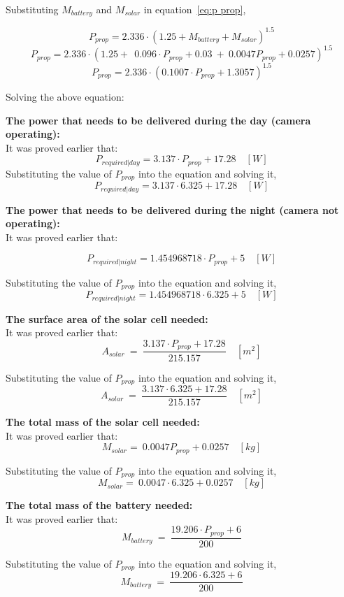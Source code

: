 \p Substituting $ M_{battery} $ and $ M_{solar} $ in equation~\ref{eq:p prop},

\[
P_{prop} = 2.336 \cdot (1.25 + M_{battery} + M_{solar})^{1.5}
\]
\[
P_{prop} = 2.336 \cdot (1.25 + \ \ 0.096 \cdot P_{prop} + 0.03 \ + \ 0.0047 P_{prop} + 0.0257 )^{1.5}
\]
\[
P_{prop} = 2.336 \cdot ( 0.1007 \cdot P_{prop} + 1.3057 )^{1.5}
\]

Solving the above equation:
\boxone

\vspace{1cm}

\p \textbf{The power that needs to be delivered during the day (camera operating):} \vspace{0.1cm}\\
It was proved earlier that:
\[
P_{required|day} = 3.137 \cdot P_{prop} + 17.28 \quad [W]
\]
Substituting the value of $ P_{prop} $ into the equation and solving it,
\[
P_{required|day} = 3.137 \cdot 6.325 + 17.28 \quad [W]
\]
\boxtwo

\vspace{1cm}

\p \textbf{The power that needs to be delivered during the night (camera not operating):} \vspace{0.1cm}\\
It was proved earlier that:

\[
P_{required | night} = 1.454968718 \cdot P_{prop} + 5 \quad [W]
\]

Substituting the value of $ P_{prop} $ into the equation and solving it,
\[
P_{required | night} = 1.454968718 \cdot 6.325 + 5 \quad [W]
\]
\boxthree

\vspace{1cm}

\p \textbf{The surface area of the solar cell needed:} \vspace{0.1cm}\\
It was proved earlier that:
\[
A_{solar} \ = \ \frac{ 3.137 \cdot P_{prop} + 17.28 }{ 215.157 } \quad [m^2]
\]

Substituting the value of $ P_{prop} $ into the equation and solving it,
\[
A_{solar} \ = \ \frac{ 3.137 \cdot 6.325 + 17.28 }{ 215.157 } \quad [m^2]
\]
\boxfour

\vspace{1cm}

\p \textbf{The total mass of the solar cell needed:} \vspace{0.1cm}\\
It was proved earlier that:
\[
M_{solar} = \ 0.0047 P_{prop} + 0.0257  \quad [kg]
\]

Substituting the value of $ P_{prop} $ into the equation and solving it,
\[
M_{solar} = \ 0.0047 \cdot 6.325 + 0.0257  \quad [kg]
\]
\boxfive

\vspace{1cm}

\p \textbf{The total mass of the battery needed:} \vspace{0.1cm}\\
It was proved earlier that:
\[
M_{battery} \ = \ \frac{ 19.206 \cdot P_{prop} + 6 }{ 200 }
\]

Substituting the value of $ P_{prop} $ into the equation and solving it,
\[
M_{battery} \ = \ \frac{ 19.206 \cdot 6.325 + 6 }{ 200 }
\]
\boxsix
